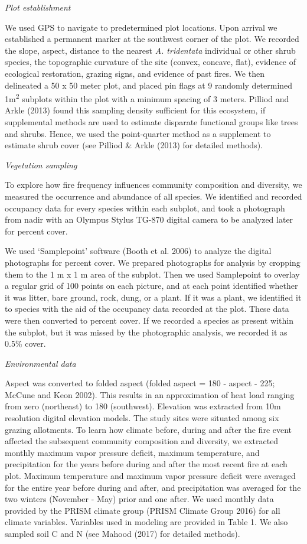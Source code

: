 \documentclass[12pt,]{article}
\begin{document}
\emph{Plot establishment}

We used GPS to navigate to predetermined plot locations. Upon arrival we
established a permanent marker at the southwest corner of the plot. We
recorded the slope, aspect, distance to the nearest \emph{A. tridentata}
individual or other shrub species, the topographic curvature of the site
(convex, concave, flat), evidence of ecological restoration, grazing
signs, and evidence of past fires. We then delineated a 50 x 50 meter
plot, and placed pin flags at 9 randomly determined
1m\textsuperscript{2} subplots within the plot with a minimum spacing of
3 meters. Pilliod and Arkle (2013) found this sampling density
sufficient for this ecosystem, if supplemental methods are used to
estimate disparate functional groups like trees and shrubs. Hence, we
used the point-quarter method as a supplement to estimate shrub cover
(see Pilliod \& Arkle (2013) for detailed methods).

\emph{Vegetation sampling}

To explore how fire frequency influences community composition and
diversity, we measured the occurrence and abundance of all species. We
identified and recorded occupancy data for every species within each
subplot, and took a photograph from nadir with an Olympus Stylus TG-870
digital camera to be analyzed later for percent cover.

We used `Samplepoint' software (Booth et al. 2006) to analyze the
digital photographs for percent cover. We prepared photographs for
analysis by cropping them to the 1 m x 1 m area of the subplot. Then we
used Samplepoint to overlay a regular grid of 100 points on each
picture, and at each point identified whether it was litter, bare
ground, rock, dung, or a plant. If it was a plant, we identified it to
species with the aid of the occupancy data recorded at the plot. These
data were then converted to percent cover. If we recorded a species as
present within the subplot, but it was missed by the photographic
analysis, we recorded it as 0.5\% cover.

\emph{Environmental data}

Aspect was converted to folded aspect (folded aspect = \textbar{}180 -
\textbar{}aspect - 225\textbar{}\textbar{}; McCune and Keon 2002). This
results in an approximation of heat load ranging from zero (northeast)
to 180 (southwest). Elevation was extracted from 10m resolution digital
elevation models. The study sites were situated among six grazing
allotments. To learn how climate before, during and after the fire event
affected the subsequent community composition and diversity, we
extracted monthly maximum vapor pressure deficit, maximum temperature,
and precipitation for the years before during and after the most recent
fire at each plot. Maximum temperature and maximum vapor pressure
deficit were averaged for the entire year before during and after, and
precipitation was averaged for the two winters (November - May) prior
and one after. We used monthly data provided by the PRISM climate group
(PRISM Climate Group 2016) for all climate variables. Variables used in
modeling are provided in Table 1. We also sampled soil C and N (see
Mahood (2017) for detailed methods).
\end{document}
